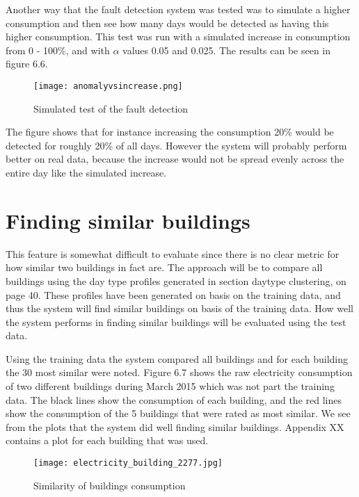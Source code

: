 Another way that the fault detection system was tested was to simulate a higher consumption and then see how many days would be detected as having this higher consumption. This test was run with a simulated increase in consumption from 0 - 100\%, and with $\alpha$ values 0.05 and 0.025. The results can be seen in figure 6.6.
\begin{figure}
\begin{center}
\texttt{[image: anomalyvsincrease.png]}
\end{center}
\caption{Simulated test of the fault detection}
\end{figure}
The figure shows that for instance increasing the consumption 20\% would be detected for roughly 20\% of all days. However the system will probably perform better on real data, because the increase would not be spread evenly across the entire day like the simulated increase.
\section*{Finding similar buildings}
This feature is somewhat difficult to evaluate since there is no clear metric for how similar two buildings in fact are. The approach will be to compare all buildings using the day type profiles generated in section daytype clustering, on page 40. These profiles have been generated on basis on the training data, and thus the system will find similar buildings on basis of the training data. How well the system performs in finding similar buildings will be evaluated using the test data.

Using the training data the system compared all buildings and for each building the 30 most similar were noted. Figure 6.7 shows the raw electricity consumption of two different buildings during March 2015 which was not part the training data. The black lines show the consumption of each building, and the red lines show the consumption of the 5 buildings that were rated as most similar. We see from the plots that the system did well finding similar buildings. Appendix XX contains a plot for each building that was used.
\begin{figure}
\begin{center}
\texttt{[image: electricity\_building\_2277.jpg]}
\end{center}
\caption{Similarity of buildings consumption}
\end{figure}

